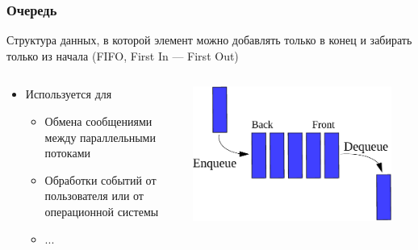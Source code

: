 \documentclass[aspectratio=169]{beamer}
\begin{document}
\begin{frame}
    \frametitle{Очередь}
    Структура данных, в которой элемент можно добавлять только в конец и забирать только из начала (FIFO, First In --- First Out)
    \begin{columns}
        \begin{column}{0.6\textwidth}
            \begin{itemize}
                \item Используется для
                      \begin{itemize}
                          \item Обмена сообщениями между параллельными потоками
                          \item Обработки событий от пользователя или от операционной системы
                          \item ...
                      \end{itemize}
            \end{itemize}
        \end{column}
        \begin{column}{0.4\textwidth}
            \begin{center}
                \includegraphics[width=0.9\textwidth]{queue.pdf}
                \begin{tiny}
                \end{tiny}
            \end{center}
        \end{column}
    \end{columns}
\end{frame}
\end{document}
